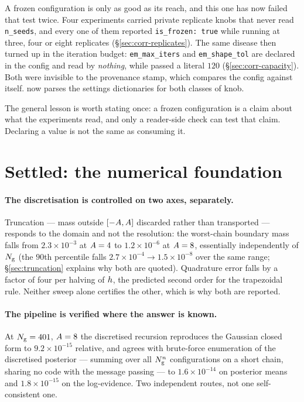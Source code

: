 \begin{pitfall}
A frozen configuration is only as good as its reach, and this one has now failed that test twice.
Four experiments carried private replicate knobs that never read \texttt{n\_seeds}, and every one
of them reported \texttt{is\_frozen: true} while running at three, four or eight replicates
(\S\ref{sec:corr-replicates}). The same disease then turned up in the iteration budget:
\texttt{em\_max\_iters} and \texttt{em\_shape\_tol} are declared in the config and read by
\emph{nothing}, while  passed a literal $120$
(\S\ref{sec:corr-capacity}). Both were invisible to the provenance stamp, which compares the
config against itself.  now parses the settings dictionaries
for both classes of knob.

The general lesson is worth stating once: a frozen configuration is a claim about what the
experiments read, and only a reader-side check can test that claim. Declaring a value is not the
same as consuming it.
\end{pitfall}

\section{Settled: the numerical foundation}
\label{sec:rec-rung0}

\paragraph{The discretisation is controlled on two axes, separately.} Truncation --- mass outside
$[-A,A]$ discarded rather than transported --- responds to the domain and not
the resolution: the worst-chain boundary mass falls from $2.3\times10^{-3}$ at $A=4$ to
$1.2\times10^{-6}$ at $A=8$, essentially independently of $N_{\mathrm{g}}$ (the $90$th percentile
falls $2.7\times10^{-4}\to1.5\times10^{-8}$ over the same range; \S\ref{sec:truncation} explains
why both are quoted). Quadrature error falls by a factor of
four per halving of $h$, the predicted second order for the trapezoidal rule. Neither sweep
alone certifies the other, which is why both are reported.

\paragraph{The pipeline is verified where the answer is known.} At $N_{\mathrm{g}}=401$, $A=8$
the discretised recursion reproduces the Gaussian closed form to $9.2\times10^{-15}$ relative,
and agrees with brute-force enumeration of the discretised posterior --- summing over all
$N_{\mathrm{g}}^{n}$ configurations on a short chain, sharing no code with the message passing ---
to $1.6\times10^{-14}$ on posterior means and $1.8\times10^{-15}$ on the log-evidence. Two
independent routes, not one self-consistent one.

